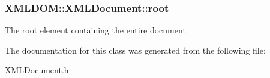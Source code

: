 \subsubsection[{\texorpdfstring{root}{root}}]{ X\+M\+L\+D\+O\+M\+::\+X\+M\+L\+Document\+::root}\hypertarget{classXMLDOM_1_1XMLDocument_a31683b4f1011941759245c61e4559d1f}{}\label{classXMLDOM_1_1XMLDocument_a31683b4f1011941759245c61e4559d1f}
The root element containing the entire document 

The documentation for this class was generated from the following file\+:\begin{DoxyCompactItemize}
\item 
X\+M\+L\+Document.\+h\end{DoxyCompactItemize}
